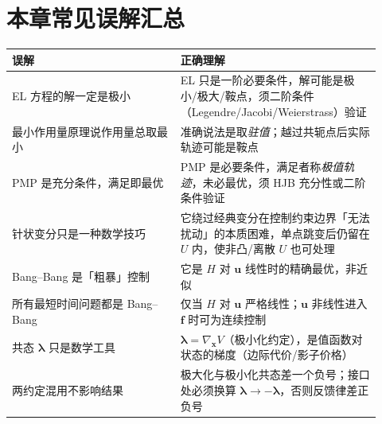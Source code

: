 \section*{本章常见误解汇总}
\begin{center}\small
\begin{tabular}{p{0.42\linewidth}p{0.5\linewidth}}
\toprule
误解 & 正确理解\\
\midrule
EL 方程的解一定是极小 & EL 只是一阶必要条件，解可能是极小/极大/鞍点，须二阶条件（Legendre/Jacobi/Weierstrass）验证\\
最小作用量原理说作用量总取最小 & 准确说法是取\emph{驻值}；越过共轭点后实际轨迹可能是鞍点\\
PMP 是充分条件，满足即最优 & PMP 是必要条件，满足者称\emph{极值轨迹}，未必最优，须 HJB 充分性或二阶条件验证\\
针状变分只是一种数学技巧 & 它绕过经典变分在控制约束边界「无法扰动」的本质困难，单点跳变后仍留在 $U$ 内，使非凸/离散 $U$ 也可处理\\
Bang--Bang 是「粗暴」控制 & 它是 $H$ 对 $\mathbf u$ 线性时的精确最优，非近似\\
所有最短时间问题都是 Bang--Bang & 仅当 $H$ 对 $\mathbf u$ 严格线性；$\mathbf u$ 非线性进入 $\mathbf f$ 时可为连续控制\\
共态 $\boldsymbol\lambda$ 只是数学工具 & $\boldsymbol\lambda=\nabla_{\mathbf x}V$（极小化约定），是值函数对状态的梯度（边际代价/影子价格）\\
两约定混用不影响结果 & 极大化与极小化共态差一个负号；接口处必须换算 $\boldsymbol\lambda\to-\boldsymbol\lambda$，否则反馈律差正负号\\
\bottomrule
\end{tabular}
\end{center}

